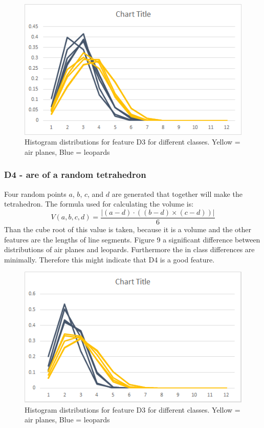\documentclass{bigdata}
\begin{document}
\begin{figure}[h!]
    \includegraphics[width=0.7\linewidth]{Pictures/Part3/D3.png}
    \caption{Histogram distributions for feature D3 for different classes. Yellow = air planes, Blue = leopards}
  \label{fig:eccentricity}
\end{figure}

\subsubsection{D4 - are of a random tetrahedron}
Four random points $a$, $b$, $c$, and $d$ are generated that together will make the tetrahedron. The formula used for calculating the volume is:
\begin{equation}
V(a,b,c,d) = \frac{|(a - d) \cdot ((b - d) \times (c - d))|}{6}
\end{equation}
Than the cube root of this value is taken, because it is a volume and the other features are the lengths of line segments. Figure 9 a significant difference between distributions of air planes and leopards. Furthermore the in class differences are minimally. Therefore this might indicate that D4 is a good feature. 
\begin{figure}[h!]
    \includegraphics[width=0.7\linewidth]{Pictures/Part3/D4.png}
    \caption{Histogram distributions for feature D3 for different classes. Yellow = air planes, Blue = leopards}
  \label{fig:eccentricity}
\end{figure}
\end{document}
